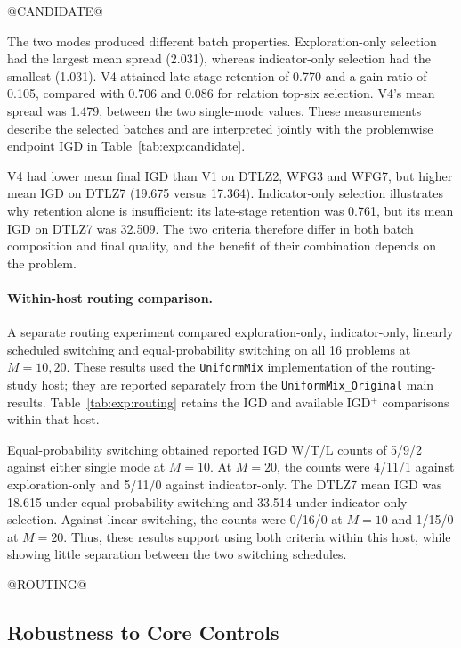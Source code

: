 @CANDIDATE@

The two modes produced different batch properties. Exploration-only
selection had the largest mean spread (2.031), whereas indicator-only
selection had the smallest (1.031). V4 attained late-stage retention
of 0.770 and a gain ratio of 0.105, compared with 0.706 and 0.086 for
relation top-six selection. V4's mean spread was 1.479, between the two
single-mode values. These measurements describe the selected batches
and are interpreted jointly with the problemwise endpoint IGD in
Table~\ref{tab:exp:candidate}.

V4 had lower mean final IGD than V1 on DTLZ2, WFG3 and WFG7, but higher
mean IGD on DTLZ7 (19.675 versus 17.364). Indicator-only selection
illustrates why retention alone is insufficient: its late-stage
retention was 0.761, but its mean IGD on DTLZ7 was 32.509. The two
criteria therefore differ in both batch composition and final quality,
and the benefit of their combination depends on the problem.

\paragraph{Within-host routing comparison.}
A separate routing experiment compared exploration-only,
indicator-only, linearly scheduled switching and equal-probability
switching on all 16 problems at $M=10,20$. These results used the
\texttt{UniformMix} implementation of the routing-study host; they are
reported separately from the \texttt{UniformMix\_Original} main results.
Table~\ref{tab:exp:routing} retains the IGD and available IGD$^+$
comparisons within that host.

Equal-probability switching obtained reported IGD W/T/L counts of
5/9/2 against either single mode at $M=10$. At $M=20$, the counts were
4/11/1 against exploration-only and 5/11/0 against indicator-only.
The DTLZ7 mean IGD was 18.615 under equal-probability switching and
33.514 under indicator-only selection. Against linear switching, the
counts were 0/16/0 at $M=10$ and 1/15/0 at $M=20$. Thus, these results
support using both criteria within this host, while showing little
separation between the two switching schedules.

@ROUTING@


\subsection{Robustness to Core Controls}
\label{sec:exp:sensitivity}

